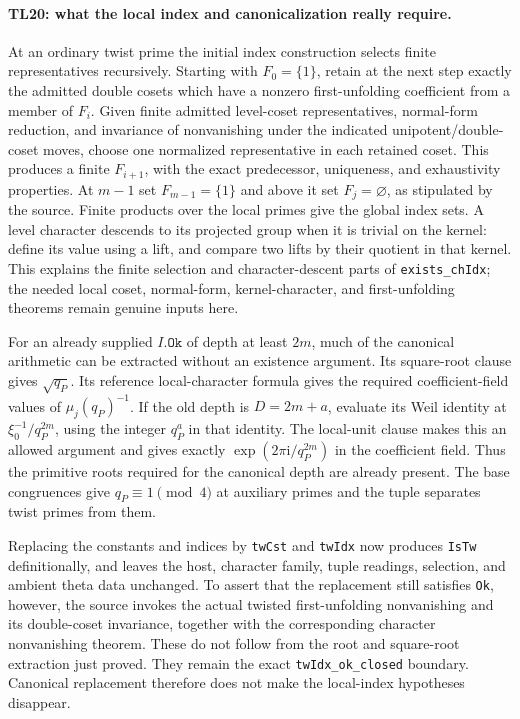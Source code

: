 \documentclass[11pt,a4paper]{article}
\numberwithin{equation}{section}
\theoremstyle{remark}\newtheorem{remark}[theorem]{Remark}
\begin{document}
\paragraph{TL20: what the local index and canonicalization really
require.}
At an ordinary twist prime the initial index construction selects
finite representatives recursively. Starting with $F_0=\{1\}$,
retain at the next step exactly the admitted double cosets which
have a nonzero first-unfolding coefficient from a member of $F_i$.
Given finite admitted level-coset representatives, normal-form
reduction, and invariance of nonvanishing under the indicated
unipotent/double-coset moves, choose one normalized representative
in each retained coset. This produces a finite $F_{i+1}$, with
the exact predecessor, uniqueness, and exhaustivity properties.
At $m-1$ set $F_{m-1}=\{1\}$ and above it set $F_j=\varnothing$,
as stipulated by the source. Finite products over the local
primes give the global index sets. A level character descends
to its projected group when it is trivial on the kernel:
define its value using a lift, and compare two lifts by their
quotient in that kernel. This explains the finite selection
and character-descent parts of \texttt{exists\_\allowbreak chIdx}; the
needed local coset, normal-form, kernel-character, and
first-unfolding theorems remain genuine inputs here.

For an already supplied $I.\texttt{Ok}$ of depth at least $2m$,
much of the canonical arithmetic can be extracted without an
existence argument. Its square-root clause gives $\sqrt{q_P}$.
Its reference local-character formula gives the required
coefficient-field values of $\mu_j(q_P)^{-1}$. If the old depth
is $D=2m+a$, evaluate its Weil identity at
$\xi_0^{-1}/q_P^{2m}$, using the integer $q_P^a$ in that
identity. The local-unit clause makes this an allowed argument
and gives exactly $\exp(2\pi\mathrm i/q_P^{2m})$ in the
coefficient field. Thus the primitive roots required for the
canonical depth are already present. The base congruences give
$q_P\equiv1\pmod4$ at auxiliary primes and the tuple separates
twist primes from them.

Replacing the constants and indices by \texttt{twCst} and
\texttt{twIdx} now produces \texttt{IsTw} definitionally,
and leaves the host, character family, tuple readings, selection,
and ambient theta data unchanged. To assert that the replacement
still satisfies \texttt{Ok}, however, the source invokes the
actual twisted first-unfolding nonvanishing and its double-coset
invariance, together with the corresponding character
nonvanishing theorem. These do not follow from the root and
square-root extraction just proved. They remain the exact
\texttt{twIdx\_\allowbreak ok\_\allowbreak closed} boundary. Canonical replacement
therefore does not make the local-index hypotheses disappear.
\end{document}
